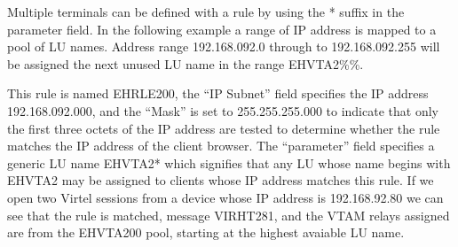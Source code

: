 \documentclass[letterpaper,10pt,english]{sphinxmanual}
\begin{document}
\sphinxAtStartPar
Multiple terminals can be defined with a rule by using the * suffix in the parameter field. In the following example a range of IP address is mapped to a pool of LU names. Address range 192.168.092.0 through to 192.168.092.255 will be assigned the next unused LU name in the range EHVTA2\%\%.

\sphinxAtStartPar
{}

\sphinxAtStartPar
This rule is named EHRLE200, the “IP Subnet” field specifies the IP address 192.168.092.000, and the “Mask” is set to 255.255.255.000 to indicate that only the first three octets of the IP address are tested to determine whether the rule matches the IP address of the client browser. The “parameter” field specifies a generic LU name EHVTA2* which signifies that any LU whose name begins with EHVTA2 may be assigned to clients whose IP address matches this rule. If we open two Virtel sessions from a device whose IP address is 192.168.92.80 we can see that the rule is matched, message VIRHT281, and the VTAM relays assigned are from the EHVTA200 pool, starting at the highest avaiable LU name.

\begin{sphinxVerbatim}[commandchars=\\\{\}]
         
 
     
    
    
         
 
     
    
    
\end{sphinxVerbatim}
\end{document}
